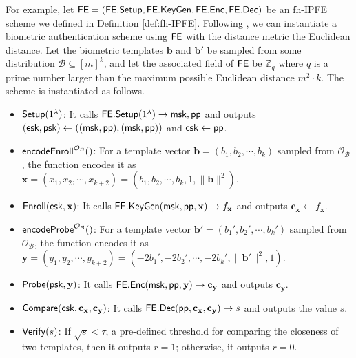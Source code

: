 For example, let ${\sf FE} = ({\sf FE.Setup}, {\sf FE.KeyGen}, {\sf FE.Enc}, {\sf FE.Dec})$ be an fh-IPFE scheme we defined in Definition \ref{def:fh-IPFE}. Following \cite{cryptoeprint:2023/481}, we can instantiate a biometric authentication scheme using ${\sf FE}$ with the distance metric the Euclidean distance. Let the biometric templates $\mathbf{b}$ and $\mathbf{b'}$ be sampled from some distribution $\mathcal{B} \subseteq [m]^k$, and let the associated field of ${\sf FE}$ be $\mathbb{Z}_q$ where $q$ is a prime number larger than the maximum possible Euclidean distance $m^2 \cdot k$. The scheme is instantiated as follows.

\begin{itemize}

	\item ${\sf Setup}(1^\lambda)$: It calls ${\sf FE.Setup}(1^\lambda) \to {\sf msk}, {\sf pp}$ and outputs $({\sf esk}, {\sf psk}) \gets (({\sf msk}, {\sf pp}), ({\sf msk}, {\sf pp}))$ and ${\sf csk} \gets {\sf pp}$.

	\item ${\sf encodeEnroll}^{\mathcal{O}_{\mathcal{B}}}()$: For a template vector $\mathbf{b} = (b_1, b_2, \cdots, b_k)$ sampled from $\mathcal{O}_{\mathcal{B}}$, the function encodes it as $\mathbf{x} = (x_1, x_2, \cdots, x_{k+2}) = (b_1, b_2, \cdots, b_k, 1, \|\mathbf{b}\|^2)$. 

	\item ${\sf Enroll}({\sf esk}, \mathbf{x})$: It calls ${\sf FE.KeyGen}({\sf msk}, {\sf pp}, \mathbf{x}) \to f_\mathbf{x}$ and outputs $\mathbf{c_x} \gets f_\mathbf{x}$.

	\item ${\sf encodeProbe}^{\mathcal{O}_{\mathcal{B}}}()$: For a template vector $\mathbf{b'} = (b_1', b_2', \cdots, b_k')$ sampled from $\mathcal{O}_{\mathcal{B}}$, the function encodes it as $\mathbf{y} = (y_1, y_2, \cdots, y_{k+2}) = (-2b_1', -2b_2', \cdots, -2b_k', \|\mathbf{b'}\|^2, 1)$.

	\item ${\sf Probe}({\sf psk}, \mathbf{y})$: It calls ${\sf FE.Enc}({\sf msk}, {\sf pp}, \mathbf{y}) \to \mathbf{c_y}$ and outputs $\mathbf{c_y}$.

	\item ${\sf Compare}({\sf csk}, \mathbf{c_x}, \mathbf{c_y)}$: It calls ${\sf FE.Dec}({\sf pp}, \mathbf{c_x}, \mathbf{c_y}) \to s$ and outputs the value $s$.

	\item ${\sf Verify}(s)$: If $\sqrt{s} < \tau$, a pre-defined threshold for comparing the closeness of two templates, then it outputs $r = 1$; otherwise, it outputs $r = 0$.

\end{itemize}

